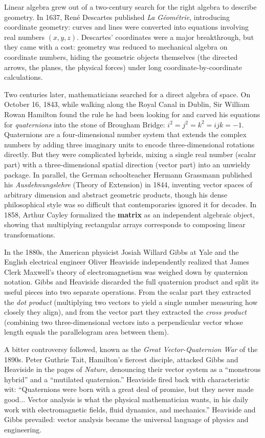 \begin{historybox}
Linear algebra grew out of a two-century search for the right algebra to describe geometry.
In 1637, René Descartes published \emph{La Géométrie}, introducing coordinate geometry: curves and lines
were converted into equations involving real numbers $(x,y,z)$. Descartes' coordinates were a major
breakthrough, but they came with a cost: geometry was reduced to mechanical algebra on coordinate numbers,
hiding the geometric objects themselves (the directed arrows, the planes, the physical forces) under
long coordinate-by-coordinate calculations.

Two centuries later, mathematicians searched for a direct algebra of space. On October 16, 1843, while walking
along the Royal Canal in Dublin, Sir William Rowan Hamilton found the rule he had been looking for and carved his
equations for \emph{quaternions} into the stone of Brougham Bridge: $i^2 = j^2 = k^2 = ijk = -1$. Quaternions
are a four-dimensional number system that extends the complex numbers by adding three imaginary units to encode
three-dimensional rotations directly. But they were complicated hybrids, mixing a single real number (scalar part)
with a three-dimensional spatial direction (vector part) into an unwieldy package. In parallel, the German
schoolteacher Hermann Grassmann published his \emph{Ausdehnungslehre} (Theory of Extension) in 1844,
inventing vector spaces of arbitrary dimension and abstract geometric products, though his dense philosophical style was so
difficult that contemporaries ignored it for decades. In 1858, Arthur Cayley formalized the \textbf{matrix} as an
independent algebraic object, showing that multiplying rectangular arrays corresponds to composing linear transformations.

In the 1880s, the American physicist Josiah Willard Gibbs at Yale and the English electrical engineer Oliver
Heaviside independently realized that James Clerk Maxwell's theory of electromagnetism was weighed down by
quaternion notation. Gibbs and Heaviside discarded the full quaternion product and split its useful pieces into
two separate operations. From the scalar part they extracted the \emph{dot product}
(multiplying two vectors to yield a single number measuring how closely they align), and
from the vector part they extracted the \emph{cross product} (combining two three-dimensional
vectors into a perpendicular vector whose length equals the parallelogram area between them).

A bitter controversy followed, known as the \emph{Great Vector-Quaternion War} of the 1890s. Peter Guthrie Tait,
Hamilton's fiercest disciple, attacked Gibbs and Heaviside in the pages of \emph{Nature}, denouncing their vector
system as a ``monstrous hybrid'' and a ``mutilated quaternion.'' Heaviside fired back with characteristic wit:
``Quaternions were born with a great deal of promise, but they never made good... Vector analysis is what the
physical mathematician wants, in his daily work with electromagnetic fields, fluid dynamics, and mechanics.''
Heaviside and Gibbs prevailed: vector analysis became the universal language of physics and engineering.


\end{historybox}
